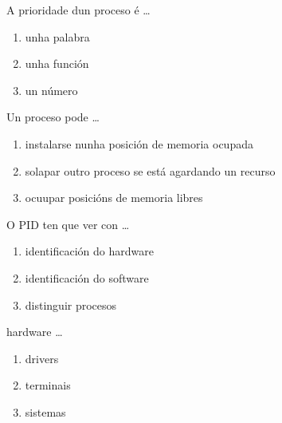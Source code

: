 \begin{diapo} \begin{frame}{ A prioridade dun proceso é   \dots} 
\begin{enumerate}
	\item unha palabra \pause
	\item unha función \pause
	\item un número 
\end{enumerate} \end{frame}  \end{diapo}  
\begin{diapo}\begin{frame}{ Un proceso pode   \dots}
\begin{enumerate}
	\item instalarse nunha posición de memoria ocupada\pause
	\item solapar outro proceso se está agardando un recurso \pause
	\item  ocuupar posicións de memoria libres
\end{enumerate} \end{frame} \end{diapo}

\begin{diapo} \begin{frame}{ O PID ten que ver con   \dots} 
\begin{enumerate}
	\item identificación do hardware\pause
	\item  identificación do software \pause
	\item distinguir procesos 
\end{enumerate} \end{frame}  \end{diapo}  
\begin{diapo}\begin{frame}{ hardware   \dots}
\begin{enumerate}
	\item drivers \pause
	\item terminais \pause
	\item sistemas 
\end{enumerate} \end{frame} \end{diapo}



